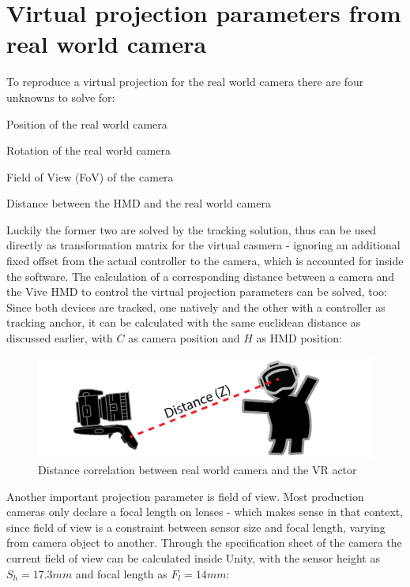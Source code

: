 %
\section{Virtual projection parameters from real world camera}
\label{sec:projection-params}
To reproduce a virtual projection for the real world camera there are four 
unknowns to solve for:

\begin{my_list}
	\item Position of the real world camera
	\item Rotation of the real world camera
	\item Field of View (FoV) of the camera
	\item Distance between the HMD and the real world camera
\end{my_list}

Luckily the former two are solved by the tracking solution, thus can be used 
directly as transformation matrix for the virtual casmera - ignoring an 
additional fixed offset from the actual controller to the camera, which is 
accounted for inside the software.
\newline
The calculation of a corresponding distance between a camera and the Vive HMD 
to control the virtual projection parameters can be solved, too: Since both 
devices are tracked, one natively and the other with a controller as 
tracking anchor, it can be calculated with the same euclidean distance as 
discussed earlier, with $C$ as camera position and $H$ as HMD position:


\begin{figure}[htb]
	\includegraphics[width=\textwidth]{gfx/distance-z.png}
	\caption{Distance correlation between real world camera and the VR actor}
	\label{fig:projection:distance}
\end{figure}

Another important projection parameter is field of view. Most production 
cameras only declare a focal length on lenses - which makes sense in that 
context, since field of view is a constraint between sensor size and focal 
length, varying from camera object to another. Through the specification sheet 
of the camera the current field of view can be calculated inside Unity, with 
the sensor height as $S_h = 17.3mm$ and focal length as $F_l = 14mm$:

